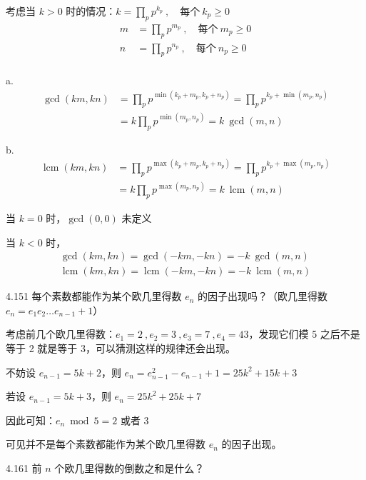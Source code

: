 考虑当 \( k > 0 \) 时的情况：\( k = \prod_{p} p^{k_p} \ , \quad \text{每个} \ k_p \ge 0 \)
\begin{align*}
  m &= \prod_{p} p^{m_p} \ , \quad \text{每个} \ m_p \ge 0 \\
  n &= \prod_{p} p^{n_p} \ , \quad \text{每个} \ n_p \ge 0 \\
\end{align*}

a.
\begin{align*}
  \gcd(km,kn) &= \prod_{p} p^{\min{(k_p+m_p,k_p+n_p)}} = \prod_{p} p^{k_p + \min{(m_p,n_p)}} \\
  &= k \prod_{p} p^{\min{(m_p,n_p)}} = k \ \gcd(m,n)
\end{align*}

b.
\begin{align*}
  \operatorname{lcm}(km,kn) &= \prod_{p} p^{\max{(k_p+m_p,k_p+n_p)}} = \prod_{p} p^{k_p + \max{(m_p,n_p)}} \\
  &= k \prod_{p} p^{\max{(m_p,n_p)}} = k \ \operatorname{lcm}(m,n)
\end{align*}

当 \( k = 0 \) 时，\( \gcd(0, 0) \) 未定义

当 \( k < 0 \) 时，
\begin{gather*}
  \gcd(km, kn) = \gcd(-km, -kn) = -k \ \gcd(m, n) \\
  \operatorname{lcm}(km, kn) = \operatorname{lcm}(-km, -kn) = -k \ \operatorname{lcm}(m, n)
\end{gather*}

\begin{problem}{4.15}{1}
  每个素数都能作为某个欧几里得数 \( e_n \) 的因子出现吗？（欧几里得数 \( e_n = e_1 e_2 \dots e_{n-1} + 1 \)）
\end{problem}

考虑前几个欧几里得数：\( e_1 = 2 \ , e_2 = 3 \ , e_3 = 7 \ , e_4 = 43 \)，发现它们模 5 之后不是等于 2 就是等于 3，可以猜测这样的规律还会出现。

不妨设 \( e_{n-1} = 5k + 2 \)，则 \( e_n = e_{n-1}^2 - e_{n-1} + 1 = 25 k^2 + 15k + 3 \)

若设 \( e_{n-1} = 5k + 3 \)，则 \( e_n = 25 k^2 + 25k + 7 \)

因此可知：\( e_n \bmod 5 = 2 \) 或者 \( 3 \)

可见并不是每个素数都能作为某个欧几里得数 \( e_n \) 的因子出现。

\begin{problem}{4.16}{1}
  前 \( n \) 个欧几里得数的倒数之和是什么？
\end{problem}

